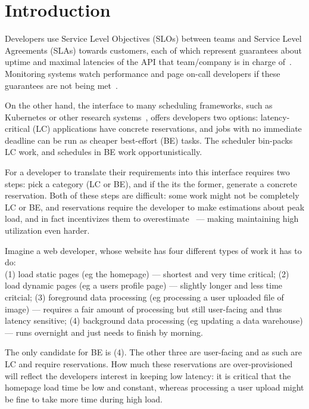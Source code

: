 \section{Introduction}

Developers use Service Level Objectives (SLOs) between teams and Service Level
Agreements (SLAs) towards customers, each of which represent guarantees about
uptime and maximal latencies of the API that team/company is in charge
of~\cite{awssla}. Monitoring systems watch performance and page on-call
developers if these guarantees are not being met~\cite{cloudwatch}.

On the other hand, the interface to many scheduling frameworks, such as
Kubernetes or other research systems~\cite{caladan}, offers developers two
options: latency-critical (LC) applications have concrete reservations, and jobs
with no immediate deadline can be run as cheaper best-effort (BE) tasks. The
scheduler bin-packs LC work, and schedules in BE work opportunistically.


For a developer to translate their requirements into this interface requires two
steps: pick a category (LC or BE), and if the its the former, generate a
concrete reservation. Both of these steps are difficult: some work might not be
completely LC or BE, and reservations require the developer to make estimations
about peak load, and in fact incentivizes them to
overestimate~\cite*{overprovision} --- making maintaining high utilization even
harder.

Imagine a web developer, whose website has four different types of work it has
to do: \\
(1) load static pages (eg the homepage) --- shortest and very time critical; 
(2) load dynamic pages (eg a users profile page) --- slightly longer and less
time critcial;
(3) foreground data processing (eg processing a user uploaded file of image) ---
requires a fair amount of processing but still user-facing and thus latency
sensitive;
(4) background data processing (eg updating a data warehouse) --- runs overnight
and just needs to finish by morning.

The only candidate for BE is (4). The other three are user-facing and as such
are LC and require reservations. How much these reservations are
over-provisioned will reflect the developers interest in keeping low latency: it
is critical that the homepage load time be low and constant, whereas processing
a user upload might be fine to take more time during high load.


